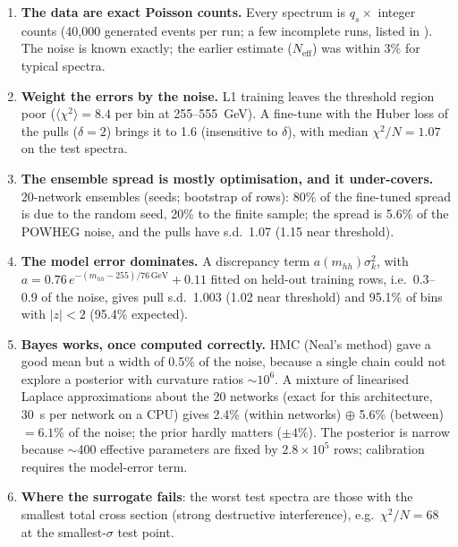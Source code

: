 \begin{keyidea}
\begin{enumerate}[leftmargin=1.3em]
  \item \textbf{The data are exact Poisson counts.} Every spectrum is $q_s \times$ integer
    counts (40,000 generated events per run; a few incomplete runs, listed in ). The noise is
    known exactly; the earlier estimate ($N_\text{eff}$) was within 3\% for typical spectra.
  \item \textbf{Weight the errors by the noise.} L1 training leaves the threshold region
    poor ($\langle\chi^2\rangle = 8.4$ per bin at 255--555~GeV). A fine-tune with the Huber
    loss of the pulls ($\delta = 2$) brings it to 1.6 (insensitive to $\delta$), with median
    $\chi^2/N = 1.07$ on the test spectra.
  \item \textbf{The ensemble spread is mostly optimisation, and it under-covers.} 20-network
    ensembles (seeds; bootstrap of rows): 80\% of the fine-tuned spread is due to the
    random seed, 20\% to the finite sample; the spread is 5.6\% of the POWHEG noise, and the
    pulls have s.d.\ 1.07 (1.15 near threshold).
  \item \textbf{The model error dominates.} A discrepancy term $a(m_{hh})\sigma_k^2$, with
    $a = 0.76\,e^{-(m_{hh}-255)/76\,\text{GeV}} + 0.11$ fitted on held-out training rows,
    i.e.\ 0.3--0.9 of the noise, gives pull s.d.\ 1.003 (1.02 near threshold) and
    95.1\% of bins with $|z|<2$ (95.4\% expected).
  \item \textbf{Bayes works, once computed correctly.} HMC (Neal's method) gave a good mean
    but a width of 0.5\% of the noise, because a single chain could not explore a posterior
    with curvature ratios $\sim\!10^6$. A mixture of linearised Laplace approximations about
    the 20 networks (exact for this architecture, 30~s per network on a CPU) gives
    2.4\% (within networks) $\oplus$ 5.6\% (between) $= 6.1\%$ of the noise; the prior
    hardly matters ($\pm4\%$). The posterior is narrow because $\sim$400 effective
    parameters are fixed by $2.8\times10^5$ rows; calibration requires the model-error term.
  \item \textbf{Where the surrogate fails}: the worst test spectra are those with the
    smallest total cross section (strong destructive interference), e.g.\ $\chi^2/N = 68$ at
    the smallest-$\sigma$ test point.
\end{enumerate}
\end{keyidea}


